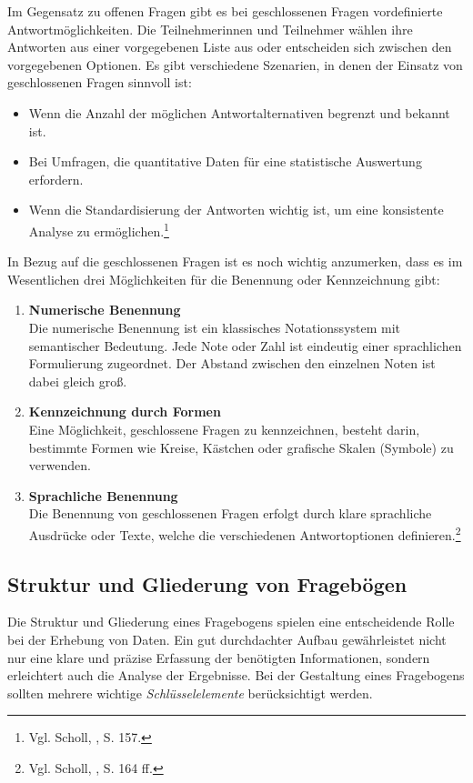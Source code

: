 Im Gegensatz zu offenen Fragen gibt es bei geschlossenen Fragen vordefinierte Antwortmöglichkeiten. Die Teilnehmerinnen
und Teilnehmer wählen ihre Antworten aus einer vorgegebenen Liste aus oder entscheiden sich zwischen den vorgegebenen
Optionen. Es gibt verschiedene Szenarien, in denen der Einsatz von geschlossenen Fragen sinnvoll ist:

\begin{itemize}
    \item Wenn die Anzahl der möglichen Antwortalternativen begrenzt und bekannt ist.
    \item Bei Umfragen, die quantitative Daten für eine statistische Auswertung erfordern.
    \item Wenn die Standardisierung der Antworten wichtig ist, um eine konsistente Analyse zu ermöglichen.\footnote{Vgl. Scholl, \cite{Die Befragung}, S. 157.}\\
\end{itemize}

In Bezug auf die geschlossenen Fragen ist es noch wichtig anzumerken, dass es im Wesentlichen drei Möglichkeiten für die
Benennung oder Kennzeichnung gibt:
\begin{enumerate}
    \item \textbf{Numerische Benennung}\\
    Die numerische Benennung ist ein klassisches Notationssystem mit semantischer Bedeutung. Jede Note oder Zahl ist
    eindeutig einer sprachlichen Formulierung zugeordnet. Der Abstand zwischen den einzelnen Noten ist dabei gleich groß.
    \item \textbf{Kennzeichnung durch Formen}\\
    Eine Möglichkeit, geschlossene Fragen zu kennzeichnen, besteht darin, bestimmte Formen wie Kreise, Kästchen oder
    grafische Skalen (Symbole) zu verwenden.
    \item \textbf{Sprachliche Benennung}\\
    Die Benennung von geschlossenen Fragen erfolgt durch klare sprachliche Ausdrücke oder Texte, welche die verschiedenen
    Antwortoptionen definieren.\footnote{Vgl. Scholl, \cite{Die Befragung}, S. 164 ff.}
\end{enumerate}

\subsection{Struktur und Gliederung von Fragebögen}
Die Struktur und Gliederung eines Fragebogens spielen eine entscheidende Rolle bei der Erhebung von Daten. Ein gut
durchdachter Aufbau gewährleistet nicht nur eine klare und präzise Erfassung der benötigten Informationen, sondern
erleichtert auch die Analyse der Ergebnisse. Bei der Gestaltung eines Fragebogens sollten mehrere wichtige \textit{Schlüsselelemente}
berücksichtigt werden.


